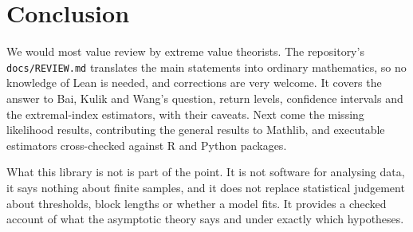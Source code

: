 \documentclass[11pt]{article}
\begin{document}
\section{Conclusion}

We would most value review by extreme value theorists. The repository's \texttt{docs/REVIEW.md} translates the main statements into ordinary mathematics,
so no knowledge of Lean is needed, and corrections are very welcome. It covers the answer to Bai, Kulik and Wang's question, return levels, confidence intervals and the extremal-index estimators, with their caveats. Next come the missing likelihood results, contributing the general
results to Mathlib, and executable estimators cross-checked against R and Python packages.

What this library is not is part of the point. It is not software for analysing data, it says nothing about finite samples, and it does not replace statistical judgement about thresholds, block lengths or whether a model fits. It provides a checked account of what the asymptotic theory says and under exactly which hypotheses.
\end{document}
